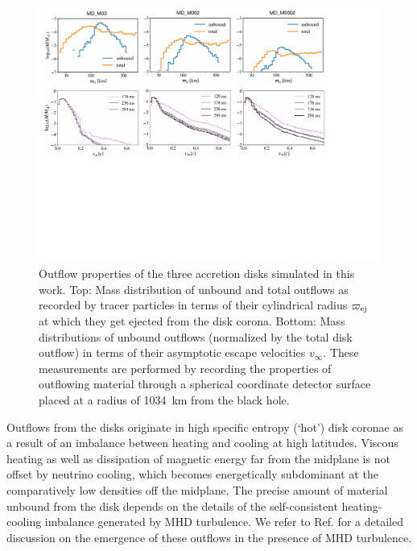 \begin{figure}[t]
  \includegraphics[width=\textwidth]{figures/kilonova/mass_vs_velocity_tracers_n_outflow.pdf}
 \caption{Outflow properties of the three accretion disks simulated in this work. Top: Mass distribution of unbound and total outflows as recorded by tracer particles in terms of their cylindrical radius $\varpi_{\rm ej}$ at which they get ejected from the disk corona. Bottom: Mass distributions of unbound outflows (normalized by the total disk outflow) in terms of their asymptotic escape velocities $v_\infty$. These measurements are performed by recording the properties of outflowing material through a spherical coordinate detector surface placed at a radius of 1034~km from the black hole.\label{fig:outflows}}
\end{figure}

Outflows from the disks originate in high specific entropy (`hot') disk coronae as a result of an imbalance between heating and cooling at high latitudes. Viscous heating as well as dissipation of magnetic energy far from the midplane is not offset by neutrino cooling, which becomes energetically subdominant at the comparatively low densities off the midplane. The precise amount of material unbound from the disk depends on the details of the self-consistent heating-cooling imbalance generated by MHD turbulence. We refer to Ref. \cite{Siegel:2017jug} for a detailed discussion on the emergence of these outflows in the presence of MHD turbulence.


